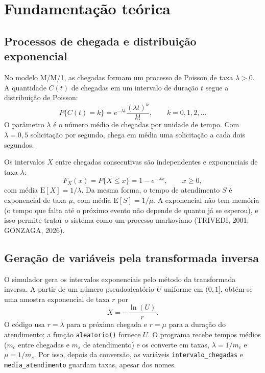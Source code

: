 \documentclass[
  article,      %
  10pt,         %
  oneside,
  a4paper,
  twocolumn,    %
  english,
  brazil        %
]{abntex2}
\begin{document}
\section{Fundamentação teórica}

\subsection{Processos de chegada e distribuição exponencial}

No modelo M/M/1, as chegadas formam um processo de Poisson de taxa $\lambda>0$. A quantidade $C(t)$ de chegadas em um intervalo de duração $t$ segue a distribuição de Poisson:
\begin{equation}
  P\{C(t)=k\}=e^{-\lambda t}\frac{(\lambda t)^k}{k!},
  \qquad k=0,1,2,\ldots
  \label{eq:poisson}
\end{equation}
O parâmetro $\lambda$ é o número médio de chegadas por unidade de tempo. Com $\lambda=0{,}5$ solicitação por segundo, chega em média uma solicitação a cada dois segundos.

Os intervalos $X$ entre chegadas consecutivas são independentes e exponenciais de taxa $\lambda$:
\begin{equation}
  F_X(x)=P\{X\leq x\}=1-e^{-\lambda x},
  \qquad x\geq 0,
  \label{eq:exponencial-chegada}
\end{equation}
com média $\mathrm{E}[X]=1/\lambda$. Da mesma forma, o tempo de atendimento $S$ é exponencial de taxa $\mu$, com média $\mathrm{E}[S]=1/\mu$. A exponencial não tem memória (o tempo que falta até o próximo evento não depende de quanto já se esperou), e isso permite tratar o sistema como um processo markoviano (TRIVEDI, 2001; GONZAGA, 2026).

\subsection{Geração de variáveis pela transformada inversa}

O simulador gera os intervalos exponenciais pelo método da transformada inversa. A partir de um número pseudoaleatório $U$ uniforme em $(0,1]$, obtém-se uma amostra exponencial de taxa $r$ por
\begin{equation}
  X=-\frac{\ln(U)}{r}.
  \label{eq:transformada-inversa}
\end{equation}
O código usa $r=\lambda$ para a próxima chegada e $r=\mu$ para a duração do atendimento; a função \texttt{aleatorio()} fornece $U$. O programa recebe tempos médios ($m_c$ entre chegadas e $m_s$ de atendimento) e os converte em taxas, $\lambda=1/m_c$ e $\mu=1/m_s$. Por isso, depois da conversão, as variáveis \texttt{intervalo\_chegadas} e \texttt{media\_atendimento} guardam taxas, apesar dos nomes.
\end{document}
